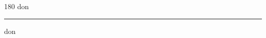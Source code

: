 
\begin{frame}
\begin{center}
\begin{turn}{180}
{\fontsize{2.5cm}{1em}\selectfont don}
\end{turn}
\vspace{1em}\par  
\hrule
\vspace{1em}\par  
{\fontsize{2.5cm}{1em}\selectfont don}
\end{center}
\end{frame}
